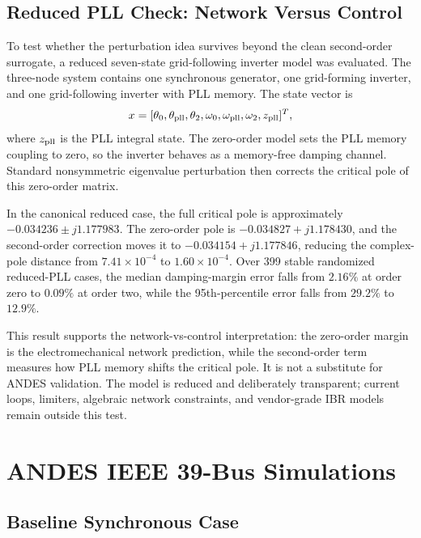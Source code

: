 \documentclass[journal]{IEEEtran}
\begin{document}
\subsection{Reduced PLL Check: Network Versus Control}

To test whether the perturbation idea survives beyond the clean second-order surrogate, a reduced seven-state grid-following inverter model was evaluated. The three-node system contains one synchronous generator, one grid-forming inverter, and one grid-following inverter with PLL memory. The state vector is
\begin{equation}
x=[\theta_0,\theta_{\rm pll},\theta_2,\omega_0,\omega_{\rm pll},\omega_2,z_{\rm pll}]^T,
\end{equation}
where $z_{\rm pll}$ is the PLL integral state. The zero-order model sets the PLL memory coupling to zero, so the inverter behaves as a memory-free damping channel. Standard nonsymmetric eigenvalue perturbation then corrects the critical pole of this zero-order matrix.

In the canonical reduced case, the full critical pole is approximately $-0.034236\pm j1.177983$. The zero-order pole is $-0.034827+j1.178430$, and the second-order correction moves it to $-0.034154+j1.177846$, reducing the complex-pole distance from $7.41\times10^{-4}$ to $1.60\times10^{-4}$. Over 399 stable randomized reduced-PLL cases, the median damping-margin error falls from $2.16\%$ at order zero to $0.09\%$ at order two, while the 95th-percentile error falls from $29.2\%$ to $12.9\%$.

This result supports the network-vs-control interpretation: the zero-order margin is the electromechanical network prediction, while the second-order term measures how PLL memory shifts the critical pole. It is not a substitute for ANDES validation. The model is reduced and deliberately transparent; current loops, limiters, algebraic network constraints, and vendor-grade IBR models remain outside this test.

\section{ANDES IEEE 39-Bus Simulations}

\subsection{Baseline Synchronous Case}
\end{document}
